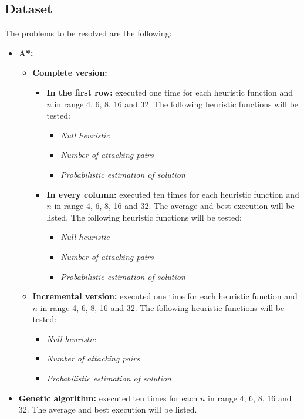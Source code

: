 \documentclass[11pt]{llncs}
\begin{document}
\subsection{Dataset}\label{dataset}
The problems to be resolved are the following:
\begin{itemize}
    \item \textbf{A*:}
    \begin{itemize}
        \item \textbf{Complete version:}
        \begin{itemize}
            \item \textbf{In the first row:} executed one time for each heuristic function and $n$ in range 4, 6, 8, 16 and 32. The following heuristic functions will be tested:
            \begin{itemize}
                \item \textit{Null heuristic}
                \item \textit{Number of attacking pairs}
                \item \textit{Probabilistic estimation of solution}
            \end{itemize}
            \item \textbf{In every column:} executed ten times for each heuristic function and $n$ in range 4, 6, 8, 16 and 32. The average and best execution will be listed. The following heuristic functions will be tested:
            \begin{itemize}
                \item \textit{Null heuristic}
                \item \textit{Number of attacking pairs}
                \item \textit{Probabilistic estimation of solution}
            \end{itemize}
        \end{itemize}
        \item \textbf{Incremental version:} executed one time for each heuristic function and $n$ in range 4, 6, 8, 16 and 32. The following heuristic functions will be tested:
        \begin{itemize}
            \item \textit{Null heuristic}
            \item \textit{Number of attacking pairs}
            \item \textit{Probabilistic estimation of solution}
        \end{itemize}
    \end{itemize}
    \item \textbf{Genetic algorithm:} executed ten times for each $n$ in range 4, 6, 8, 16 and 32. The average and best execution will be listed.
\end{itemize}
\end{document}
